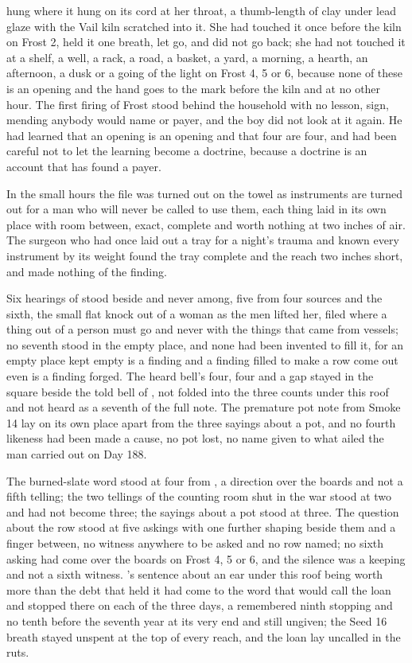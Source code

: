  hung where it hung on its cord at her throat, a thumb-length of clay under lead glaze with the Vail kiln scratched into it. She had touched it once before the kiln on Frost 2, held it one breath, let go, and did not go back; she had not touched it at a shelf, a well, a rack, a road, a basket, a yard, a morning, a hearth, an afternoon, a dusk or a going of the light on Frost 4, 5 or 6, because none of these is an opening and the hand goes to the mark before the kiln and at no other hour. The first firing of Frost stood behind the household with no lesson, sign, mending anybody would name or payer, and the boy did not look at it again. He had learned that an opening is an opening and that four are four, and had been careful not to let the learning become a doctrine, because a doctrine is an account that has found a payer.

\scenebreak

In the small hours the file was turned out on the towel as instruments are turned out for a man who will never be called to use them, each thing laid in its own place with room between, exact, complete and worth nothing at two inches of air. The surgeon who had once laid out a tray for a night's trauma and known every instrument by its weight found the tray complete and the reach two inches short, and made nothing of the finding.

Six hearings of  stood beside and never among, five from four sources and the sixth, the small flat knock out of a woman as the men lifted her, filed where a thing out of a person must go and never with the things that came from vessels; no seventh stood in the empty place, and none had been invented to fill it, for an empty place kept empty is a finding and a finding filled to make a row come out even is a finding forged. The heard bell's four, four and a gap stayed in the square beside the told bell of , not folded into the three counts under this roof and not heard as a seventh of the full note. The premature pot note from Smoke 14 lay on its own place apart from the three sayings about a pot, and no fourth likeness had been made a cause, no pot lost, no name given to what ailed the man carried out on Day 188.

The burned-slate word stood at four from , a direction over the boards and not a fifth telling; the two tellings of the counting room shut in the war stood at two and had not become three; the sayings about a pot stood at three. The question about the row stood at five askings with one further shaping beside them and a finger between, no witness anywhere to be asked and no row named; no sixth asking had come over the boards on Frost 4, 5 or 6, and the silence was a keeping and not a sixth witness. 's sentence about an ear under this roof being worth more than the debt that held it had come to the word that would call the loan and stopped there on each of the three days, a remembered ninth stopping and no tenth before the seventh year at its very end and still ungiven; the Seed 16 breath stayed unspent at the top of every reach, and the loan lay uncalled in the ruts.

